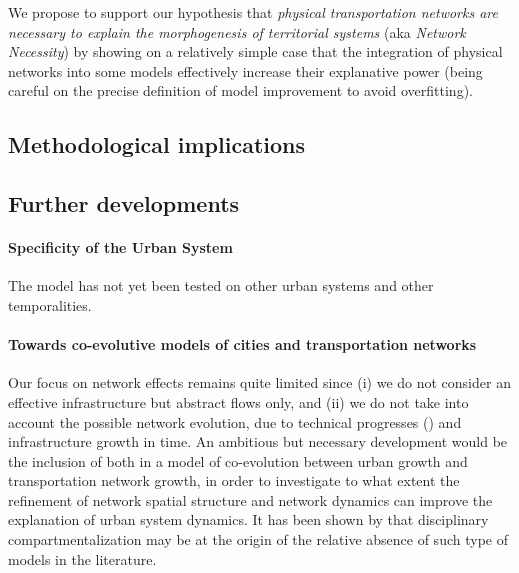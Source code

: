 \documentclass[Royal,sageh,times]{sagej}
\begin{document}
We propose to support our hypothesis that \textit{physical transportation networks are necessary to explain the morphogenesis of territorial systems} (aka \textit{Network Necessity}) by showing on a relatively simple case that the integration of physical networks into some models effectively increase their explanative power (being careful on the precise definition of model improvement to avoid overfitting).





\subsection{Methodological implications}





\subsection{Further developments}


\paragraph{Specificity of the Urban System}

The model has not yet been tested on other urban systems and other temporalities.



\paragraph{Towards co-evolutive models of cities and transportation networks}

Our focus on network effects remains quite limited since (i) we do not consider an effective infrastructure but abstract flows only, and (ii) we do not take into account the possible network evolution, due to technical progresses (\cite{bretagnolle2000long}) and infrastructure growth in time. An ambitious but necessary development would be the inclusion of both in a model of co-evolution between urban growth and transportation network growth, in order to investigate to what extent the refinement of network spatial structure and network dynamics can improve the explanation of urban system dynamics. It has been shown by \cite{raimbault2016models} that disciplinary compartmentalization may be at the origin of the relative absence of such type of models in the literature.
\end{document}
